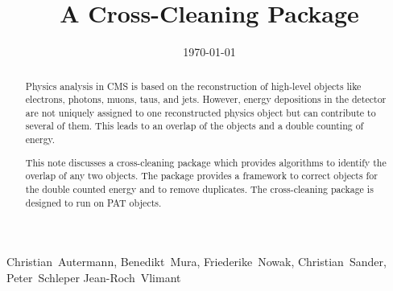 \documentclass{cmspaper}
\begin{document}

\begin{titlepage}

\date{\today}

\title{A Cross-Cleaning Package}

\begin{Authlist}
    Christian~Autermann, Benedikt~Mura, Friederike~Nowak, Christian~Sander, Peter~Schleper
    Jean-Roch~Vlimant
\end{Authlist}




\begin{abstract}
Physics analysis in CMS is based on the reconstruction of high-level objects
like electrons, photons, muons, taus, and jets. However, energy depositions in
the detector are not uniquely assigned to one reconstructed physics object but
can contribute to several of them. This leads to an overlap of the objects and
a double counting of energy.

This note discusses a cross-cleaning package which provides algorithms to
identify the overlap of any two objects. The package provides a framework to
correct objects for the double counted energy and to remove duplicates. The
cross-cleaning package is designed to run on {\sc PAT} objects.
\end{abstract} 


\end{titlepage}

\end{document}
